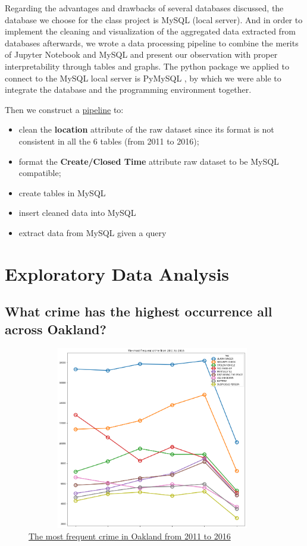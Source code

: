 \documentclass{article} %
\begin{document}
Regarding the advantages and drawbacks of several databases discussed, the database we choose for the class project is MySQL (local server). And in order to implement the cleaning and visualization of the aggregated data extracted from databases afterwards, we wrote a data processing pipeline to combine the merits of Jupyter Notebook and MySQL and present our observation with proper interpretability through tables and graphs. The python package we applied to connect to the MySQL local server is PyMySQL \cite{pymysql}, by which we were able to integrate the database and the programming environment together.


Then we construct a \hyperref[appendix:preprocess]{pipeline} to:

\begin{itemize}
	\item clean the \textbf{location} attribute of the raw dataset since its format is not consistent in all the 6 tables (from 2011 to 2016);
	\item format the \textbf{Create/Closed Time} attribute raw dataset to be MySQL compatible;
	\item create tables in MySQL
	\item insert cleaned data into MySQL
	\item extract data from MySQL given a query
\end{itemize} 

\section{Exploratory Data Analysis \textit{}}

\subsection{What crime has the highest occurrence all across Oakland?}

\begin{figure}[H]
	\begin{center}
		\includegraphics[height=8cm, width=11cm]{1.png}
	\end{center}
	\caption{\hyperref[appendix:plot1]{The most frequent crime in Oakland from 2011 to 2016}}
\end{figure}
\end{document}
